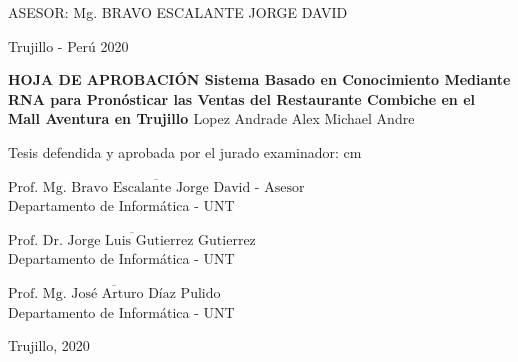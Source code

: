 \vskip 3.2cm
\begin{center}
   {\bf \doublespacing {\fontsize{17}{20.4}\selectfont{SISTEMA BASADO EN CONOCIMIENTO MEDIANTE RNA PARA PRONÓSTICAR LAS VENTAS  DEL RESTAURANTE COMBICHE EN EL MALL AVENTURA EN TRUJILLO }}}     
\end{center}   
  \vskip 2cm
\begin{verse}
 \fontsize{12}{14.4}
\end{verse}
%
\vskip 1.5cm 
{\fontsize{14}{16.8}\selectfont ASESOR: Mg. BRAVO ESCALANTE JORGE DAVID} 
 \vskip 1cm 
 \begin{center}    
 \vskip 2cm
{\fontsize{14}{16.8}\selectfont Trujillo - Perú
\vskip 0.2cm
\hspace*{-0.2cm} 
2020}
\end{center} 
\newpage
%
\begin{center}
 {\bf {\Large HOJA DE APROBACIÓN }     
 \vskip 1.5cm
  {\Large Sistema Basado en Conocimiento Mediante RNA para Pronósticar las Ventas del Restaurante Combiche en el Mall Aventura en Trujillo }}
 \vskip 1cm 
  \large{Lopez Andrade Alex Michael Andre}
 \vskip 1cm
\end{center} 
Tesis defendida y aprobada por el jurado examinador:
 cm
\begin{flushleft} 
$\overline{\mbox{Prof. Mg. Bravo Escalante Jorge David - Asesor}}$\\
\vskip -0.5cm
Departamento de Informática - UNT
\end{flushleft} 
\vskip 1cm
\begin{flushleft} 
$\overline{\mbox{Prof. Dr. Jorge Luis Gutierrez Gutierrez}}$\\
\vskip -0.5cm
Departamento de Informática - UNT
\end{flushleft} 
\vskip 1cm
\begin{flushleft} 
$\overline{\mbox{Prof. Mg. José Arturo Díaz Pulido}}$\\
\vskip -0.5cm
Departamento de Informática - UNT
\end{flushleft}
\vskip 0.8cm 
\begin{center}    
Trujillo, 2020
\end{center} 
\newpage

